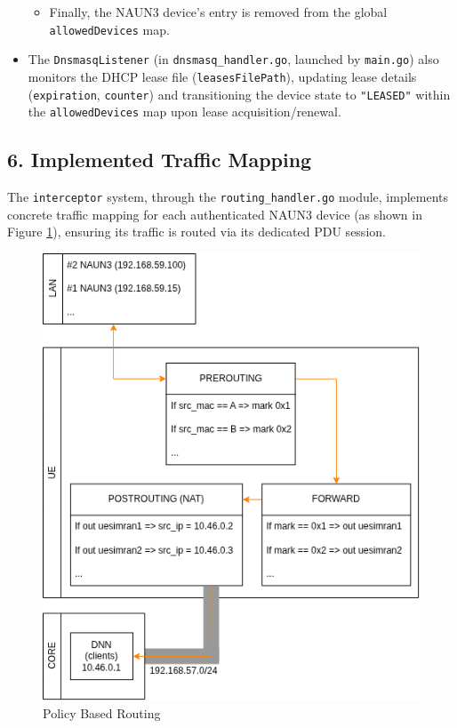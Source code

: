 \begin{itemize}
{\begin{itemize}
            \item Finally, the \ac{NAUN3} device's entry is removed from the global \texttt{allowedDevices} map.
        \end{itemize}
    }

    \item The \texttt{DnsmasqListener} (in \texttt{dnsmasq\_handler.go}, launched by \texttt{main.go}) also monitors the \ac{DHCP} lease file (\texttt{leasesFilePath}), updating lease details (\texttt{expiration}, \texttt{counter}) and transitioning the device state to \texttt{"LEASED"} within the \texttt{allowedDevices} map upon lease acquisition/renewal.
\end{itemize}

\subsection{6. Implemented Traffic Mapping}

The \texttt{interceptor} system, through the \texttt{routing\_handler.go} module, implements concrete traffic mapping for each authenticated \ac{NAUN3} device (as shown in Figure \ref{fig:policy-based-routing}), ensuring its traffic is routed via its dedicated \ac{PDU} session.

\begin{figure}
    \centering
    \includegraphics[width=0.60\linewidth]{figs/topology-Policy Based Routing.png}
    \caption{Policy Based Routing}
    \label{fig:policy-based-routing}
\end{figure}

